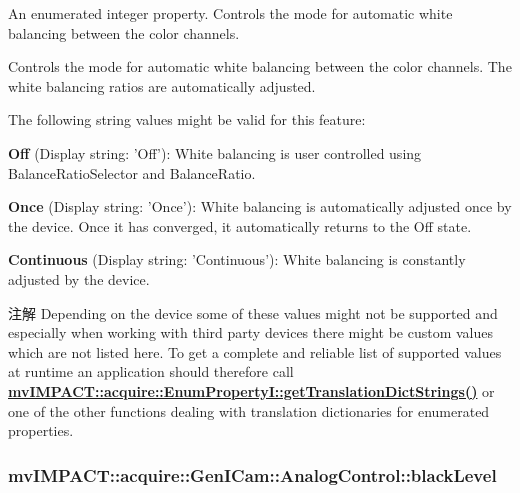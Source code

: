 An enumerated integer property. Controls the mode for automatic white balancing between the color channels. 

Controls the mode for automatic white balancing between the color channels. The white balancing ratios are automatically adjusted.

The following string values might be valid for this feature\+:
\begin{DoxyItemize}
\item {\bfseries Off} (Display string\+: 'Off')\+: White balancing is user controlled using Balance\+Ratio\+Selector and Balance\+Ratio.
\item {\bfseries Once} (Display string\+: 'Once')\+: White balancing is automatically adjusted once by the device. Once it has converged, it automatically returns to the Off state.
\item {\bfseries Continuous} (Display string\+: 'Continuous')\+: White balancing is constantly adjusted by the device.
\end{DoxyItemize}

\begin{DoxyNote}{注解}
Depending on the device some of these values might not be supported and especially when working with third party devices there might be custom values which are not listed here. To get a complete and reliable list of supported values at runtime an application should therefore call {\bfseries \hyperlink{classmv_i_m_p_a_c_t_1_1acquire_1_1_enum_property_i_a0ba6ccbf5ee69784d5d0b537924d26b6}{mv\+I\+M\+P\+A\+C\+T\+::acquire\+::\+Enum\+Property\+I\+::get\+Translation\+Dict\+Strings()}} or one of the other functions dealing with translation dictionaries for enumerated properties. 
\end{DoxyNote}
\hypertarget{classmv_i_m_p_a_c_t_1_1acquire_1_1_gen_i_cam_1_1_analog_control_a09233a9934ef09d6c77f3ff339af59c0}{
\subsubsection[{black\+Level}]{ mv\+I\+M\+P\+A\+C\+T\+::acquire\+::\+Gen\+I\+Cam\+::\+Analog\+Control\+::black\+Level}}\label{classmv_i_m_p_a_c_t_1_1acquire_1_1_gen_i_cam_1_1_analog_control_a09233a9934ef09d6c77f3ff339af59c0}


